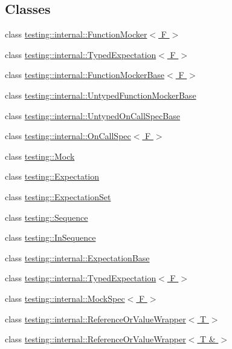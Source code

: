 \subsection*{Classes}
\begin{DoxyCompactItemize}
\item 
class \hyperlink{classtesting_1_1internal_1_1_function_mocker}{testing\+::internal\+::\+Function\+Mocker$<$ F $>$}
\item 
class \hyperlink{classtesting_1_1internal_1_1_typed_expectation}{testing\+::internal\+::\+Typed\+Expectation$<$ F $>$}
\item 
class \hyperlink{classtesting_1_1internal_1_1_function_mocker_base}{testing\+::internal\+::\+Function\+Mocker\+Base$<$ F $>$}
\item 
class \hyperlink{classtesting_1_1internal_1_1_untyped_function_mocker_base}{testing\+::internal\+::\+Untyped\+Function\+Mocker\+Base}
\item 
class \hyperlink{classtesting_1_1internal_1_1_untyped_on_call_spec_base}{testing\+::internal\+::\+Untyped\+On\+Call\+Spec\+Base}
\item 
class \hyperlink{classtesting_1_1internal_1_1_on_call_spec}{testing\+::internal\+::\+On\+Call\+Spec$<$ F $>$}
\item 
class \hyperlink{classtesting_1_1_mock}{testing\+::\+Mock}
\item 
class \hyperlink{classtesting_1_1_expectation}{testing\+::\+Expectation}
\item 
class \hyperlink{classtesting_1_1_expectation_set}{testing\+::\+Expectation\+Set}
\item 
class \hyperlink{classtesting_1_1_sequence}{testing\+::\+Sequence}
\item 
class \hyperlink{classtesting_1_1_in_sequence}{testing\+::\+In\+Sequence}
\item 
class \hyperlink{classtesting_1_1internal_1_1_expectation_base}{testing\+::internal\+::\+Expectation\+Base}
\item 
class \hyperlink{classtesting_1_1internal_1_1_typed_expectation}{testing\+::internal\+::\+Typed\+Expectation$<$ F $>$}
\item 
class \hyperlink{classtesting_1_1internal_1_1_mock_spec}{testing\+::internal\+::\+Mock\+Spec$<$ F $>$}
\item 
class \hyperlink{classtesting_1_1internal_1_1_reference_or_value_wrapper}{testing\+::internal\+::\+Reference\+Or\+Value\+Wrapper$<$ T $>$}
\item 
class \hyperlink{classtesting_1_1internal_1_1_reference_or_value_wrapper_3_01_t_01_6_01_4}{testing\+::internal\+::\+Reference\+Or\+Value\+Wrapper$<$ T \& $>$}

\end{DoxyCompactItemize}
